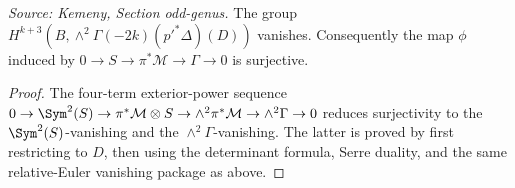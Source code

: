 \begin{proposition}
  \label{prop:kemeny_odd_wedge2_gamma_vanishing}
  \textit{Source: Kemeny, Section odd-genus.}
  The group
  \(H^{k+3}(B,\wedge^2\Gamma(-2k)(p'^*\Delta)(D))\) vanishes.  Consequently the
  map \(\phi\) induced by \(0\to S\to\pi^*\mathcal M\to\Gamma\to0\) is
  surjective.
\end{proposition}
\begin{proof}
  The four-term exterior-power sequence
  \(0\to\Sym^2(S)\to\pi^*\mathcal M\otimes S\to\wedge^2\pi^*\mathcal M
  \to\wedge^2\Gamma\to0\) reduces surjectivity to the \(\Sym^2(S)\)-vanishing
  and the \(\wedge^2\Gamma\)-vanishing.  The latter is proved by first restricting
  to \(D\), then using the determinant formula, Serre duality, and the same
  relative-Euler vanishing package as above.
\end{proof}

